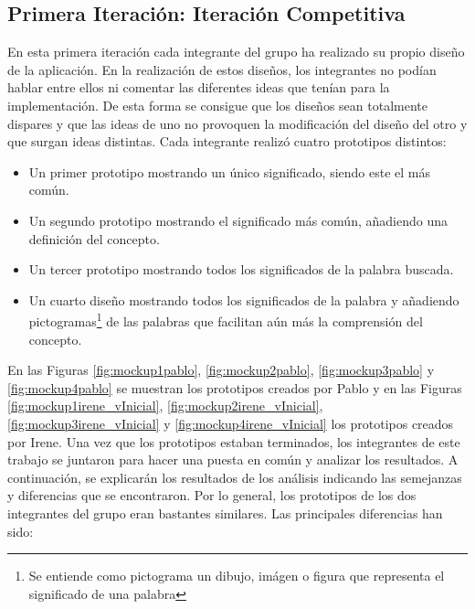 \subsection{Primera Iteración: Iteración Competitiva}
\label{cap:subsec:iteracionCompetitiva}

En esta primera iteración cada integrante del grupo ha realizado su propio diseño de la aplicación. En la realización de estos diseños, los integrantes no podían hablar entre ellos ni comentar las diferentes ideas que tenían para la implementación. De esta forma se consigue que los diseños sean totalmente dispares y que las ideas de uno no provoquen la modificación del diseño del otro y que surgan ideas distintas.
Cada integrante realizó cuatro prototipos distintos:
\begin{itemize}
	\item Un primer prototipo mostrando un único significado, siendo este el más común.
	\item Un segundo prototipo mostrando el significado más común, añadiendo una definición del concepto.
	\item Un tercer prototipo mostrando todos los significados de la palabra buscada.
	\item Un cuarto diseño mostrando todos los significados de la palabra y añadiendo pictogramas\footnote{Se entiende como pictograma un dibujo, imágen o figura que representa el significado de una palabra} de las palabras que facilitan aún más la comprensión del concepto.
	
\end{itemize}

En las Figuras \ref{fig:mockup1pablo}, \ref{fig:mockup2pablo}, \ref{fig:mockup3pablo} y \ref{fig:mockup4pablo} se muestran los prototipos creados por Pablo y en las Figuras \ref{fig:mockup1irene_vInicial}, \ref{fig:mockup2irene_vInicial},  \ref{fig:mockup3irene_vInicial} y \ref{fig:mockup4irene_vInicial} los prototipos creados por Irene.
Una vez que los prototipos estaban terminados, los integrantes de este trabajo se juntaron para hacer una puesta en común y analizar los resultados. A continuación, se explicarán los resultados de los análisis indicando las semejanzas y diferencias que se encontraron.
Por lo general, los prototipos de los dos integrantes del grupo eran bastantes similares. Las principales diferencias han sido:

